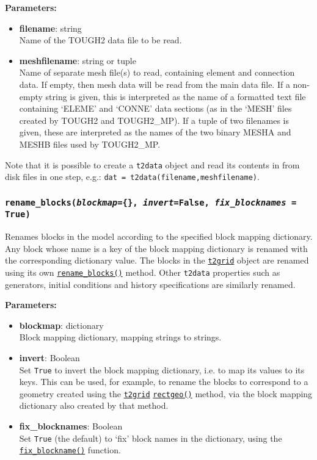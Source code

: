 \textbf{Parameters:}
\begin{itemize}
\item \textbf{filename}: string\\
  Name of the TOUGH2 data file to be read.
\item \textbf{meshfilename}: string or tuple\\
  Name of separate mesh file(s) to read, containing element and connection data.  If empty, then mesh data will be read from the main data file.  If a non-empty string is given, this is interpreted as the name of a formatted text file containing `ELEME' and `CONNE' data sections (as in the `MESH' files created by TOUGH2 and TOUGH2\_MP). If a tuple of two filenames is given, these are interpreted as the names of the two binary MESHA and MESHB files used by TOUGH2\_MP.
\end{itemize}

Note that it is possible to create a \texttt{t2data} object and read its contents in from disk files in one step, e.g.: \texttt{dat = t2data(filename,meshfilename)}.

\begin{snugshade}
\subsubsection{\texttt{rename\_blocks(\emph{blockmap}=\{\}, \emph{invert}=False, \emph{fix\_blocknames} = True)}}
\end{snugshade}
\label{sec:t2data:rename_blocks}

Renames blocks in the model according to the specified block mapping dictionary. Any block whose name is a key of the block mapping dictionary is renamed with the corresponding dictionary value. The blocks in the \hyperref[t2grids]{\texttt{t2grid}} object are renamed using its own \hyperref[sec:t2grid:rename_blocks]{\texttt{rename\_blocks()}} method. Other \texttt{t2data} properties such as generators, initial conditions and history specifications are similarly renamed.

\textbf{Parameters:}
\begin{itemize}
\item \textbf{blockmap}: dictionary\\
  Block mapping dictionary, mapping strings to strings.
\item \textbf{invert}: Boolean\\
  Set \texttt{True} to invert the block mapping dictionary, i.e. to map its values to its keys. This can be used, for example, to rename the blocks to correspond to a geometry created using the \hyperref[t2grids]{\texttt{t2grid}} \hyperref[sec:t2grid:rectgeo]{\texttt{rectgeo()}} method, via the block mapping dictionary also created by that method.
\item \textbf{fix\_blocknames}: Boolean\\
  Set \texttt{True} (the default) to `fix' block names in the dictionary, using the \hyperref[sec:mulgrid:fix_blockname]{\texttt{fix\_blockname()}} function. 
\end{itemize}

